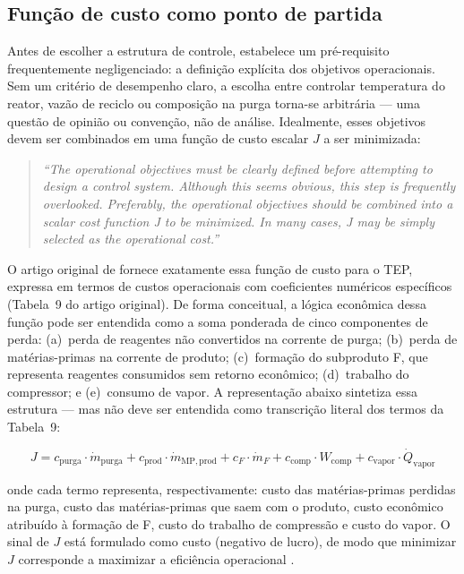 \subsection{Função de custo como ponto de partida}
\label{subsec:custo}

Antes de escolher a estrutura de controle,  estabelece um
pré-requisito frequentemente negligenciado: a definição explícita dos objetivos operacionais. Sem um
critério de desempenho claro, a escolha entre controlar temperatura do reator, vazão de reciclo ou
composição na purga torna-se arbitrária — uma questão de opinião ou convenção, não de análise.
Idealmente, esses objetivos devem ser combinados em uma função de custo escalar $J$ a ser minimizada:

\begin{quote}
	\textit{``The operational objectives must be clearly defined before attempting to design a control
		system. Although this seems obvious, this step is frequently overlooked. Preferably, the operational
		objectives should be combined into a scalar cost function J to be minimized. In many cases, J may be
		simply selected as the operational cost.''} \cite{Skogestad2004}
\end{quote}

O artigo original de  fornece exatamente essa função de custo para o TEP,
expressa em termos de custos operacionais com coeficientes numéricos específicos (Tabela~9 do artigo
original). De forma conceitual, a lógica econômica dessa função pode ser entendida como a soma
ponderada de cinco componentes de perda: (a)~perda de reagentes não convertidos na corrente de
purga; (b)~perda de matérias-primas na corrente de produto; (c)~formação do subproduto F, que
representa reagentes consumidos sem retorno econômico; (d)~trabalho do compressor; e (e)~consumo de
vapor. A representação abaixo sintetiza essa estrutura — mas não deve ser entendida como transcrição
literal dos termos da Tabela~9:

\begin{equation}
	J = c_{\mathrm{purga}} \cdot \dot{m}_{\mathrm{purga}}
	+ c_{\mathrm{prod}} \cdot \dot{m}_{\mathrm{MP,prod}}
	+ c_F \cdot \dot{m}_F
	+ c_{\mathrm{comp}} \cdot W_{\mathrm{comp}}
	+ c_{\mathrm{vapor}} \cdot \dot{Q}_{\mathrm{vapor}}
	\label{eq:tep_cost}
\end{equation}

\noindent onde cada termo representa, respectivamente: custo das matérias-primas perdidas na purga,
custo das matérias-primas que saem com o produto, custo econômico atribuído à formação de F, custo
do trabalho de compressão e custo do vapor. O sinal de $J$ está formulado como custo (negativo de
lucro), de modo que minimizar $J$ corresponde a maximizar a eficiência operacional \cite{DOWNS1993}.

